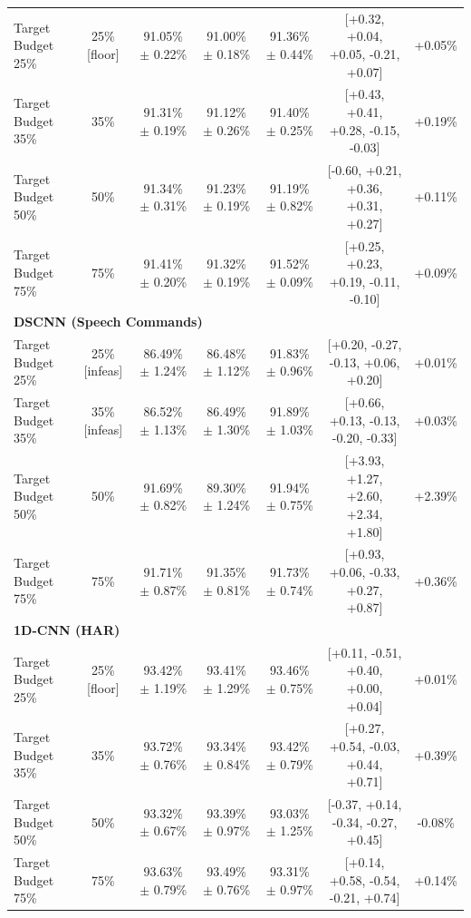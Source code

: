 \begin{table}[!t]
\begin{tabular}{lcccccc}
\quad Target Budget 25\% & 25\% [floor] & 91.05\% $\pm$ 0.22\% & 91.00\% $\pm$ 0.18\% & 91.36\% $\pm$ 0.44\% & [+0.32, +0.04, +0.05, -0.21, +0.07] & +0.05\% \\
\quad Target Budget 35\% & 35\% & 91.31\% $\pm$ 0.19\% & 91.12\% $\pm$ 0.26\% & 91.40\% $\pm$ 0.25\% & [+0.43, +0.41, +0.28, -0.15, -0.03] & +0.19\% \\
\quad Target Budget 50\% & 50\% & 91.34\% $\pm$ 0.31\% & 91.23\% $\pm$ 0.19\% & 91.19\% $\pm$ 0.82\% & [-0.60, +0.21, +0.36, +0.31, +0.27] & +0.11\% \\
\quad Target Budget 75\% & 75\% & 91.41\% $\pm$ 0.20\% & 91.32\% $\pm$ 0.19\% & 91.52\% $\pm$ 0.09\% & [+0.25, +0.23, +0.19, -0.11, -0.10] & +0.09\% \\
\midrule
\multicolumn{7}{l}{\textbf{DSCNN (Speech Commands)}}\\
\quad Target Budget 25\% & 25\% [infeas] & 86.49\% $\pm$ 1.24\% & 86.48\% $\pm$ 1.12\% & 91.83\% $\pm$ 0.96\% & [+0.20, -0.27, -0.13, +0.06, +0.20] & +0.01\% \\
\quad Target Budget 35\% & 35\% [infeas] & 86.52\% $\pm$ 1.13\% & 86.49\% $\pm$ 1.30\% & 91.89\% $\pm$ 1.03\% & [+0.66, +0.13, -0.13, -0.20, -0.33] & +0.03\% \\
\quad Target Budget 50\% & 50\% & 91.69\% $\pm$ 0.82\% & 89.30\% $\pm$ 1.24\% & 91.94\% $\pm$ 0.75\% & [+3.93, +1.27, +2.60, +2.34, +1.80] & +2.39\% \\
\quad Target Budget 75\% & 75\% & 91.71\% $\pm$ 0.87\% & 91.35\% $\pm$ 0.81\% & 91.73\% $\pm$ 0.74\% & [+0.93, +0.06, -0.33, +0.27, +0.87] & +0.36\% \\
\midrule
\multicolumn{7}{l}{\textbf{1D-CNN (HAR)}}\\
\quad Target Budget 25\% & 25\% [floor] & 93.42\% $\pm$ 1.19\% & 93.41\% $\pm$ 1.29\% & 93.46\% $\pm$ 0.75\% & [+0.11, -0.51, +0.40, +0.00, +0.04] & +0.01\% \\
\quad Target Budget 35\% & 35\% & 93.72\% $\pm$ 0.76\% & 93.34\% $\pm$ 0.84\% & 93.42\% $\pm$ 0.79\% & [+0.27, +0.54, -0.03, +0.44, +0.71] & +0.39\% \\
\quad Target Budget 50\% & 50\% & 93.32\% $\pm$ 0.67\% & 93.39\% $\pm$ 0.97\% & 93.03\% $\pm$ 1.25\% & [-0.37, +0.14, -0.34, -0.27, +0.45] & -0.08\% \\
\quad Target Budget 75\% & 75\% & 93.63\% $\pm$ 0.79\% & 93.49\% $\pm$ 0.76\% & 93.31\% $\pm$ 0.97\% & [+0.14, +0.58, -0.54, -0.21, +0.74] & +0.14\% \\
\bottomrule
\end{tabular}
\end{table}
